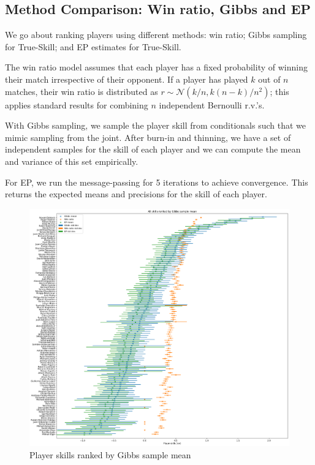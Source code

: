 \documentclass[]{article}
\newcommand{\Ncal}{\mathcal{N}}
\begin{document}
\clearpage
\subsection{Method Comparison: Win ratio, Gibbs and EP}

We go about ranking players using different methods: win ratio; Gibbs sampling for True-Skill; and EP estimates for True-Skill.

The win ratio model assumes that each player has a fixed probability of winning their match irrespective of their opponent. If a player has played $k$ out of $n$ matches, their win ratio is distributed as $r \sim \Ncal(k/n, k(n-k)/n^2)$; this applies standard results for combining $n$ independent Bernoulli r.v.'s.

With Gibbs sampling, we sample the player skill from conditionals such that we mimic sampling from the joint. After burn-in and thinning, we have a set of independent samples for the skill of each player and we can compute the mean and variance of this set empirically.

For EP, we run the message-passing for 5 iterations to achieve convergence. This returns the expected means and precisions for the skill of each player.

\begin{figure}[!h]
	\centering
	\includegraphics[width=\linewidth]{combined-ranking.png}
	\caption{Player skills ranked by Gibbs sample mean}
	\label{fig:combined-ranking}
\end{figure}
\end{document}
